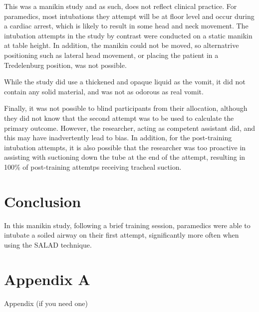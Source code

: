 \documentclass[]{article}
\begin{document}
This was a manikin study and as such, does not reflect clinical
practice. For paramedics, most intubations they attempt will be at floor
level and occur during a cardiac arrest, which is likely to result in
some head and neck movement. The intubation attempts in the study by
contrast were conducted on a static manikin at table height. In
addition, the manikin could not be moved, so alternatrive positioning
such as lateral head movement, or placing the patient in a Tredelenburg
position, was not possible.

While the study did use a thickened and opaque liquid as the vomit, it
did not contain any solid material, and was not as odorous as real
vomit.

Finally, it was not possible to blind participants from their
allocation, although they did not know that the second attempt was to be
used to calculate the primary outcome. However, the researcher, acting
as competent assistant did, and this may have inadvertently lead to
bias. In addition, for the post-training intubation attempts, it is also
possible that the researcher was too proactive in assisting with
suctioning down the tube at the end of the attempt, resulting in 100\%
of post-training attemtps receiving tracheal suction.

\hypertarget{conclusion-1}{%
\section{Conclusion}\label{conclusion-1}}

In this manikin study, following a brief training session, paramedics
were able to intubate a soiled airway on their first attempt,
significantly more often when using the SALAD technique.

\hypertarget{appendix-a}{%
\section{Appendix A}\label{appendix-a}}

Appendix (if you need one)


\end{document}
